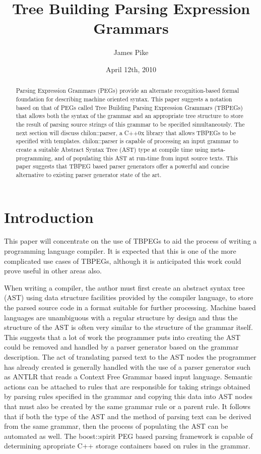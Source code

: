 \documentclass[a4paper,11pt]{article}
\title{Tree Building Parsing Expression Grammars}
\author{James Pike}
\date{April 12th, 2010}
\begin{document}
\maketitle

\begin{abstract}
Parsing Expression Grammars (PEGs) provide an alternate recognition-based formal foundation for describing machine oriented syntax\cite{peg}.
This paper suggests a notation based on that of PEGs called Tree Building Parsing Expression Grammars (TBPEGs) that allows both the syntax of the grammar and an appropriate tree structure to store the result of parsing source strings of this grammar to be specified simultaneously.
The next section will discuss chilon::parser, a C++0x library that allows TBPEGs to be specified with templates.
chilon::parser is capable of processing an input grammar to create a suitable Abstract Syntax Tree (AST) type at compile time using meta-programming, and of populating this AST at run-time from input source texts.
This paper suggests that TBPEG based parser generators offer a powerful and concise alternative to existing parser generator state of the art.
\end{abstract}

\section{Introduction}
This paper will concentrate on the use of TBPEGs to aid the process of writing a programming language compiler.
It is expected that this is one of the more complicated use cases of TBPEGs, although it is anticipated this work could prove useful in other areas also.

When writing a compiler, the author must first create an abstract syntax tree (AST) using data structure facilities provided by the compiler language, to store the parsed source code in a format suitable for further processing.
Machine based languages are unambiguous with a regular structure by design and thus the structure of the AST is often very similar to the structure of the grammar itself.
This suggests that a lot of work the programmer puts into creating the AST could be removed and handled by a parser generator based on the grammar description.
The act of translating parsed text to the AST nodes the programmer has already created is generally handled with the use of a parser generator such as ANTLR\cite{antlr} that reads a Context Free Grammar based input language.
Semantic actions can be attached to rules that are responsible for taking strings obtained by parsing rules specified in the grammar and copying this data into AST nodes that must also be created by the same grammar rule or a parent rule.
It follows that if both the type of the AST and the method of parsing text can be derived from the same grammar, then the process of populating the AST can be automated as well.
The boost::spirit\cite{boostspirit} PEG based parsing framework is capable of determining apropriate C++ storage containers based on rules in the grammar.
\end{document}
